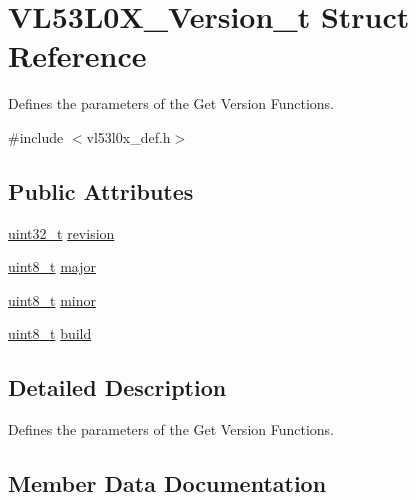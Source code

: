 \hypertarget{structVL53L0X__Version__t}{}\section{V\+L53\+L0\+X\+\_\+\+Version\+\_\+t Struct Reference}
\label{structVL53L0X__Version__t}


Defines the parameters of the Get Version Functions.  




{\ttfamily \#include $<$vl53l0x\+\_\+def.\+h$>$}

\subsection*{Public Attributes}
\begin{DoxyCompactItemize}
\item 
\hyperlink{vl53l0x__types_8h_a435d1572bf3f880d55459d9805097f62}{uint32\+\_\+t} \hyperlink{structVL53L0X__Version__t_ab4a7231e7d29bf587f55919438f453a6}{revision}
\item 
\hyperlink{vl53l0x__types_8h_aba7bc1797add20fe3efdf37ced1182c5}{uint8\+\_\+t} \hyperlink{structVL53L0X__Version__t_ab11a400c567bc52f47ed13c23a535b06}{major}
\item 
\hyperlink{vl53l0x__types_8h_aba7bc1797add20fe3efdf37ced1182c5}{uint8\+\_\+t} \hyperlink{structVL53L0X__Version__t_a0ae0926fe003ade5547da0483447d99b}{minor}
\item 
\hyperlink{vl53l0x__types_8h_aba7bc1797add20fe3efdf37ced1182c5}{uint8\+\_\+t} \hyperlink{structVL53L0X__Version__t_a504ac1ff3cd99738e1e5a368867a0d40}{build}
\end{DoxyCompactItemize}


\subsection{Detailed Description}
Defines the parameters of the Get Version Functions. 

\subsection{Member Data Documentation}
\mbox{\label{structVL53L0X__Version__t_a504ac1ff3cd99738e1e5a368867a0d40}} 
